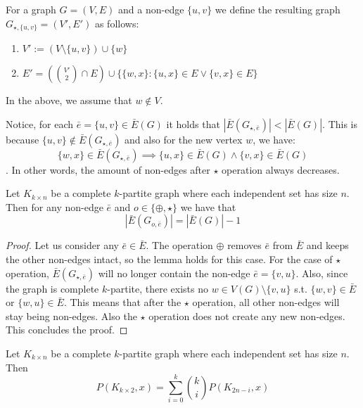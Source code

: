 \begin{highlight}
\begin{defn}
    For a graph $G=(V,E)$ and a non-edge $\{u,v\}$ we define the resulting graph $G_{\star,\{u,v\}} = (V',E')$ as follows:
    \begin{enumerate}
        \item $V' := (V \setminus \{u,v\}) \cup \{w\}$
        \item $E' = (\binom{V'}{2} \cap E) \cup \{\{w,x\} : \{u,x\} \in E \vee \{v,x\} \in E\}$
    \end{enumerate}
    In the above, we assume that $w \notin V$.
\end{defn}

Notice, for each $\bar{e} = \{u,v\}\in \bar{E}(G)$ it holds that $|\bar{E}(G_{\star,\bar{e}})| < |\bar{E}(G)|$. This is because $\{u,v\} \notin \bar{E}(G_{\star,\bar{e}})$ and also for the new vertex $w$, we have: \[\{w,x\} \in \bar{E}(G_{\star,\bar{e}}) \implies \{u,x\} \in \bar{E}(G) \wedge \{v,x\} \in \bar{E}(G)\]. In other words, the amount of non-edges after $\star$ operation always decreases.

\begin{lemma}
    Let $K_{k \times n}$ be a complete $k$-partite graph where each independent set has size $n$. Then for any non-edge $\bar{e}$ and $o \in \{\oplus,\star\}$ we have that \[|\bar{E}(G_{o,\bar{e}})| = |\bar{E}(G)| - 1\]
\end{lemma}

\begin{proof}
    Let us consider any $\bar{e} \in \bar{E}$. The operation $\oplus$ removes $\bar{e}$ from $\bar{E}$ and keeps the other non-edges intact, so the lemma holds for this case. For the case of $\star$ operation, $\bar{E}(G_{\star,\bar{e}})$ will no longer contain the non-edge $\bar{e}=\{v,u\}$. Also, since the graph is complete $k$-partite, there exists no $w \in V(G) \setminus \{v,u\}$ s.t. $\{w,v\} \in \bar{E}$ or $\{w,u\} \in \bar{E}$. This means that after the $\star$ operation, all other non-edges will stay being non-edges. Also the $\star$ operation does not create any new non-edges. This concludes the proof.
\end{proof}

\begin{claim}
    Let $K_{k \times n}$ be a complete $k$-partite graph where each independent set has size $n$. Then \[P(K_{k \times 2},x) = \sum_{i=0}^{k} \binom{k}{i} P(K_{2n-i},x)\]
\end{claim}

\end{highlight}